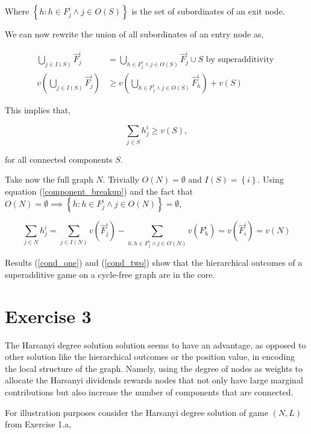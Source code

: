 \documentclass[american]{scrartcl}
\newcommand{\set}[1]{\left\{#1\right\}}
\begin{document}
Where $\set{h: h \in F_j^i \land j \in O(S)}$ is the set of subordinates of an exit node.

We can now rewrite the union of all subordinates of an entry node as,

\begin{equation}
    \begin{split}
        \bigcup_{j \in I(S)} \hat{F}^i_j &= \bigcup_{h \in F_j^i \land j \in O(S)} \hat{F}^i_j \cup S \text{ by superadditivity } \\
        v\left( \bigcup_{j \in I(S)} \hat{F}^i_j \right) &\geq v\left( \bigcup_{h \in F_j^i \land j \in O(S)} \hat{F}^i_h \right) + v(S)
    \end{split}
\end{equation}

This implies that,

\begin{equation} \label{cond_one}
    \sum_{j \in S} h_j^i \geq v(S),
\end{equation}

for all connected components $S$.

Take now the full graph $N$. Trivially $O(N) = \emptyset$ and $I(S) = \set{i}$. Using equation (\ref{component_breakup}) and the fact that $O(N) = \emptyset \implies \set{h: h \in F_j^i \land j \in O(N)} = \emptyset$,

\begin{equation} \label{cond_two}
    \sum_{j \in N} h^i_j = \sum_{j \in I(N)} v(\hat{F}_j^i) - \sum_{h: h \in F_j^i \land j \in O(N)} v(F^i_h) = v(\hat{F}_i^i) = v(N)
\end{equation}

Results (\ref{cond_one}) and (\ref{cond_two}) show that the hierarchical outcomes of a superadditive game on a cycle-free graph are in the core.

\section*{Exercise 3}

The Harsanyi degree solution solution seems to have an advantage, as opposed to other solution like the hierarchical outcomes or the position value, in encoding the local structure of the graph. Namely, using the degree of nodes as weights to allocate the Harsanyi dividends rewards nodes that not only have large marginal contributions but also increase the number of components that are connected.

For illustration purposes consider the Harsanyi degree solution of game $(N, L)$ from Exercise 1.a,
\end{document}

